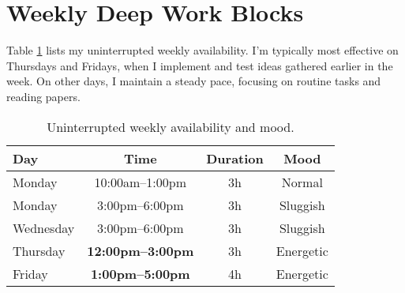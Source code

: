 \documentclass[9pt, twoside, twocolumn]{extarticle}
\begin{document}
\section{Weekly Deep Work Blocks}\label{sec:deep-work}
Table \ref{sec:deep-work} lists my uninterrupted weekly availability. I'm typically most effective on Thursdays and Fridays, when I implement and test ideas gathered earlier in the week. On other days, I maintain a steady pace, focusing on routine tasks and reading papers.

\begin{table}[h]
  \centering
  \small
  \begin{tabular}{lccc}
    \hline
    \textbf{Day} & \textbf{Time} & \textbf{Duration} & \textbf{Mood} \\
    \hline
    Monday    & 10:00am--1:00pm & 3h & Normal \\
    Monday    & 3:00pm--6:00pm  & 3h & Sluggish \\
    Wednesday & 3:00pm--6:00pm  & 3h & Sluggish \\
    Thursday  & \textbf{12:00pm--3:00pm} & 3h & Energetic \\
    Friday    & \textbf{1:00pm--5:00pm}  & 4h & Energetic \\
    \hline
  \end{tabular}
  \caption{Uninterrupted weekly availability and mood.}
  \label{tab:deep-work}
\end{table}



\fontacknowledgment


\end{document}
